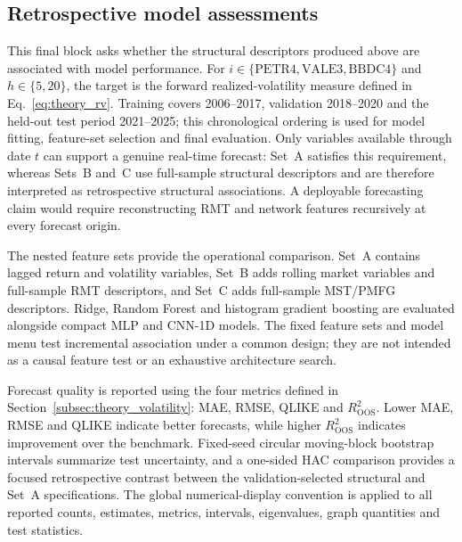 \subsection{Retrospective model assessments}
\label{subsec:experimental_framework}
\label{subsec:forecast_metrics}
\label{subsec:evaluation_method}

This final block asks whether the structural descriptors produced above are associated with model performance. For $i\in\{\mathrm{PETR4},\mathrm{VALE3},\mathrm{BBDC4}\}$ and $h\in\{5,20\}$, the target is the forward realized-volatility measure defined in Eq.~\eqref{eq:theory_rv}. Training covers 2006--2017, validation 2018--2020 and the held-out test period 2021--2025; this chronological ordering is used for model fitting, feature-set selection and final evaluation. Only variables available through date $t$ can support a genuine real-time forecast: Set~A satisfies this requirement, whereas Sets~B and~C use full-sample structural descriptors and are therefore interpreted as retrospective structural associations. A deployable forecasting claim would require reconstructing RMT and network features recursively at every forecast origin.

The nested feature sets provide the operational comparison. Set~A contains lagged return and volatility variables, Set~B adds rolling market variables and full-sample RMT descriptors, and Set~C adds full-sample MST/PMFG descriptors. Ridge, Random Forest and histogram gradient boosting are evaluated alongside compact MLP and CNN-1D models. The fixed feature sets and model menu test incremental association under a common design; they are not intended as a causal feature test or an exhaustive architecture search.

Forecast quality is reported using the four metrics defined in Section~\ref{subsec:theory_volatility}: MAE, RMSE, QLIKE and $R^2_{\mathrm{OOS}}$. Lower MAE, RMSE and QLIKE indicate better forecasts, while higher $R^2_{\mathrm{OOS}}$ indicates improvement over the benchmark. Fixed-seed circular moving-block bootstrap intervals summarize test uncertainty, and a one-sided HAC comparison provides a focused retrospective contrast between the validation-selected structural and Set~A specifications. The global numerical-display convention is applied to all reported counts, estimates, metrics, intervals, eigenvalues, graph quantities and test statistics.
